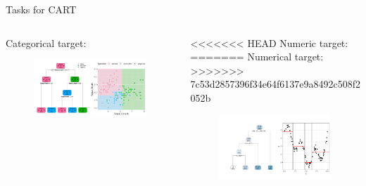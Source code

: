 \documentclass[11pt,compress,t,notes=noshow, xcolor=table]{beamer}
\begin{document}
\begin{vbframe}{Tasks for CART}
  \begin{columns}
\begin{column}{0.5\textwidth}
  Categorical target:
    \begin{figure}
    \centering
\includegraphics[width=0.99\textwidth, keepaspectratio]{figure/tree-classif-depth3.pdf}
    \end{figure}
\end{column}
\begin{column}{0.5\textwidth}
<<<<<<< HEAD
  Numeric target:
=======
  Numerical target:
>>>>>>> 7c53d2857396f34e64f6137e9a8492c508f2052b
    \begin{figure}
    \centering
\includegraphics[width=0.99\textwidth, keepaspectratio]{figure/tree-regr-depth3.pdf}
    \end{figure}
\end{column}
\end{columns}
  
\end{vbframe}
\end{document}
